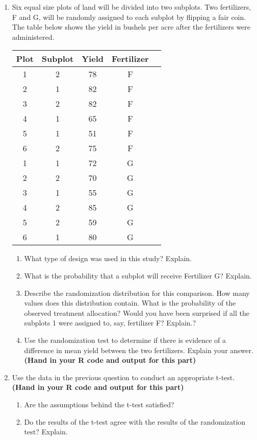 \documentclass[11pt, oneside]{article}   	%
\begin{document}
\begin{enumerate}

\newpage

\item Six equal size plots of land will be divided into two subplots. Two fertilizers, F and G, will be randomly assigned to each subplot by flipping a fair coin.  The table below shows the yield in bushels per acre after the fertilizers were administered. 


\begin{table}[h!]
\begin{center}
\begin{tabular}{c c |c c c }
Plot & Subplot & Yield & Fertilizer\\
\hline
1 & 2 & 78 & F\\
2 & 1 & 82 & F\\
3 & 2 & 82 & F\\
4 & 1 & 65 & F\\
5 & 1 & 51 & F \\
6 & 2 & 75 & F \\
1 & 1 & 72 & G \\
2 & 2 & 70 & G \\
3 & 1 & 55 & G \\
4 & 2 & 85 & G \\
5 & 2 & 59 & G \\
6 & 1 & 80 & G 

\end{tabular}
\end{center}
\label{default}
\end{table}

\begin{enumerate}
\item What type of design was used in this study?  Explain.
\item What is the probability that a subplot will receive Fertilizer G?  Explain.
\item Describe the randomization distribution for this comparison.  How many values does this distribution contain. What is the probability of the observed treatment allocation?  Would you have been surprised if all the subplots 1 were assigned to, say, fertilizer F?  Explain.?
\item Use the randomization test to determine if there is evidence of a difference in mean yield between the two fertilizers.  Explain your answer.  {\bf (Hand in your R code and output for this part)}
\end{enumerate}

\item Use the data in the previous question to conduct an appropriate t-test.  {\bf (Hand in your R code and output for this part)}


\begin{enumerate}

\item Are the assumptions behind the t-test satisfied?  
\item Do the results of the t-test agree with the results of the randomization test?  Explain. 


\end{enumerate}

\end {enumerate}
\end{document}
